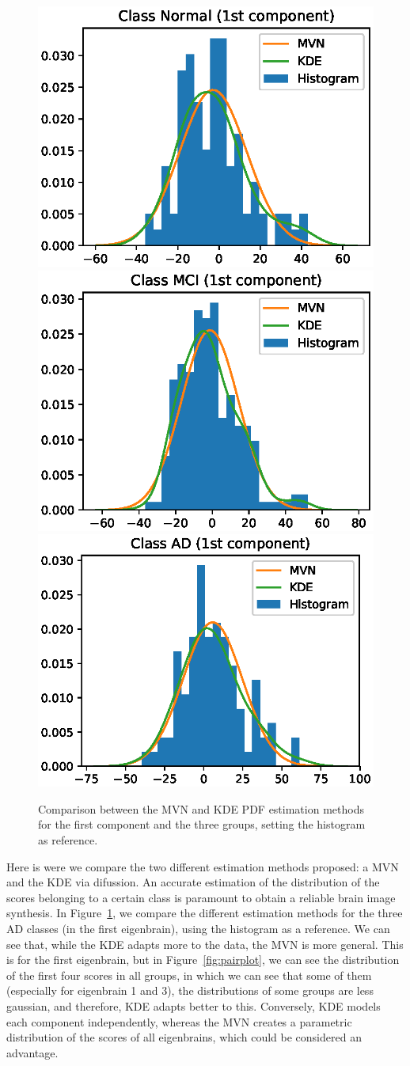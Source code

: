 \begin{figure}[h]
	\centering
	\includegraphics[width=0.3\linewidth]{Graphics/ch8/compMethods_Normal1st}
	\includegraphics[width=0.3\linewidth]{Graphics/ch8/compMethods_MCI1st}
	\includegraphics[width=0.3\linewidth]{Graphics/ch8/compMethods_AD1st}
	\caption{Comparison between the \acs{MVN} and \acs{KDE} \acs{PDF} estimation methods for the first component and the three groups, setting the histogram as reference.}
	\label{fig:comparisonEstimatesSyn}
\end{figure}

Here is were we compare the two different estimation methods proposed: a \acf{MVN} and the \acf{KDE} via difussion. An accurate estimation of the distribution of the scores belonging to a certain class is paramount to obtain a reliable brain image synthesis. In Figure~\ref{fig:comparisonEstimatesSyn}, we compare the different estimation methods for the three \ac{AD} classes (in the first eigenbrain), using the histogram as a reference. We can see that, while the \ac{KDE} adapts more to the data, the \ac{MVN} is more general. This is for the first eigenbrain, but in Figure~\ref{fig:pairplot}, we can see the distribution of the first four scores in all groups, in which we can see that some of them (especially for eigenbrain 1 and 3), the distributions of some groups are less gaussian, and therefore, \ac{KDE} adapts better to this. Conversely, \ac{KDE} models each component independently, whereas the \ac{MVN} creates a parametric distribution of the scores of all eigenbrains, which could be considered an advantage. 

